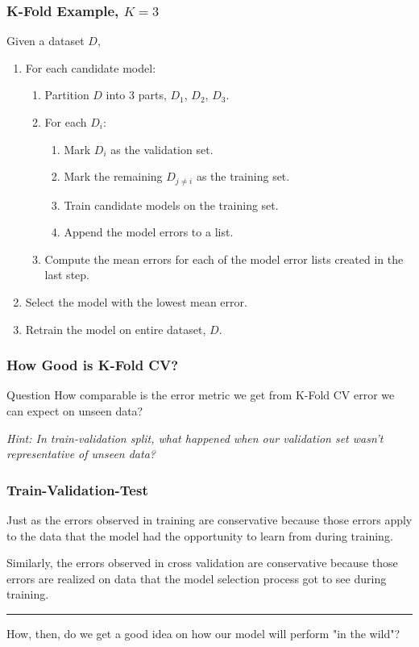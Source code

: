 \documentclass{beamer}
\begin{document}
\begin{frame}
  \frametitle{K-Fold Example, $K=3$}
  Given a dataset $D$,
  \begin{enumerate}
    \item For each candidate model:
    \begin{enumerate}
      \item Partition $D$ into 3 parts, $D_1$, $D_2$, $D_3$.
      \item For each $D_i$:
        \begin{enumerate}
          \item Mark $D_i$ as the validation set.
          \item Mark the remaining $D_{j \ne i}$ as the training set.
          \item Train candidate models on the training set.
          \item Append the model errors to a list.
        \end{enumerate}
      \item Compute the mean errors for each of the model error lists created in the last step.
    \end{enumerate}
    \item Select the model with the lowest mean error.
    \item Retrain the model on entire dataset, $D$.
  \end{enumerate}
\end{frame}

\begin{frame}
  \frametitle{How Good is K-Fold CV?}
  \begin{block}{Question}
    How comparable is the error metric we get from K-Fold CV error we can expect on unseen data?
  \end{block} \vspace{4mm} \pause
  \textit{Hint: In train-validation split, what happened when our validation set wasn't representative of unseen data?}
\end{frame}

\begin{frame}
  \frametitle{Train-Validation-Test}
  Just as the errors observed in training are conservative because those errors apply to the data that the model had the opportunity to learn from during training. \vspace{6mm}

  Similarly, the errors observed in cross validation are conservative because those errors are realized on data that the model selection process got to see during training. \vspace{1mm}

  \noindent\hfil\rule{\textwidth}{.4pt}\hfil \vspace{3mm}
  \pause
  
  How, then, do we get a good idea on how our model will perform "in the wild"?
\end{frame}
\end{document}
